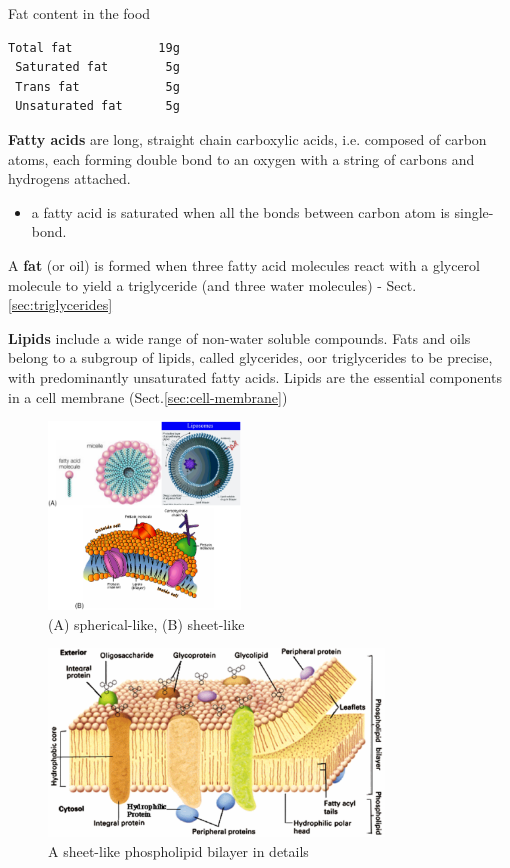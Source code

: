 Fat content in the food
\begin{verbatim}
Total fat            19g
 Saturated fat        5g
 Trans fat            5g
 Unsaturated fat      5g
\end{verbatim}

{\bf Fatty acids} are long, straight chain carboxylic acids, i.e. composed of
carbon atoms, each forming double bond to an oxygen with a string of carbons and
hydrogens attached. 
\begin{itemize}
  \item a fatty acid is saturated when all the bonds between carbon atom is
  single-bond.
\end{itemize}

A {\bf fat} (or oil) is formed when three fatty acid molecules react with a
glycerol molecule to yield a triglyceride (and three water molecules)
- Sect.\ref{sec:triglycerides}

{\bf Lipids} include a wide range of non-water soluble compounds. Fats and oils
belong to a subgroup of lipids, called glycerides, oor triglycerides to be
precise, with predominantly unsaturated fatty acids. Lipids are the essential
components in a cell membrane (Sect.\ref{sec:cell-membrane})

\begin{figure}[hbt]
  \centerline{\includegraphics[height=5cm,
    angle=0]{./images/lipid_layers.eps}}
\caption{(A) spherical-like, (B) sheet-like}
\label{fig:lipids}
\end{figure}

\begin{figure}[hbt]
  \centerline{\includegraphics[height=5cm,
    angle=0]{./images/sheetlike_bilayer.eps}}
\caption{A sheet-like phospholipid bilayer in details}
\label{fig:sheet-like}
\end{figure}


